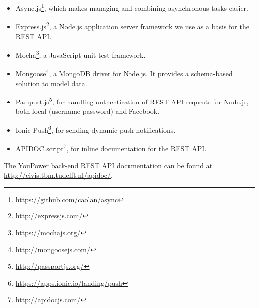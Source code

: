 \begin{itemize}
\item Async.js\footnote{\url{https://github.com/caolan/async}}, which makes managing and combining asynchronous tasks easier. 
\item Express.js\footnote{\url{http://expressjs.com/}}, a Node.js application server framework we use as a basis for the REST API. 
\item Mocha\footnote{\url{https://mochajs.org/}}, a JavaScript unit test framework. 
\item Mongoose\footnote{\url{http://mongoosejs.com/}}, a MongoDB driver for Node.js. It provides a schema-based solution to model data. 
\item Passport.js\footnote{\url{http://passportjs.org/}}, for handling authentication of REST API requests for Node.js, both local (username password) and Facebook. 
\item Ionic Push\footnote{\url{https://apps.ionic.io/landing/push}}, for sending dynamic push notifications. 
\item APIDOC script\footnote{\url{http://apidocjs.com/}}, for inline documentation for the REST API. 
\end{itemize}

The YouPower back-end REST API documentation can be found at {\footnotesize\url{http://civis.tbm.tudelft.nl/apidoc/}}. 
% 

